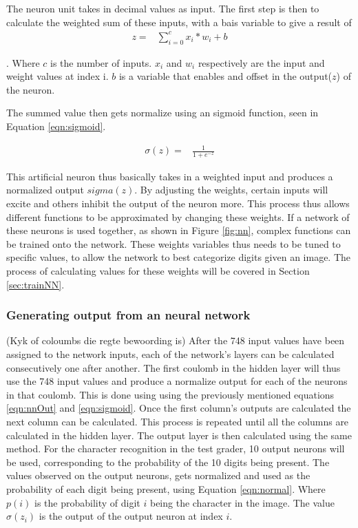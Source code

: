 The neuron unit takes in decimal values as input. The first step is then to calculate the weighted sum of these inputs, with a bais variable to give a result of 
\begin{align}
  z =  &\displaystyle{\sum_{i=0}^{c} x_{i}*w_{i} + b}
\label{eqn:nnOut}
\end{align}

.  Where $c$ is the number of inputs. $x_{i}$ and $w_{i}$ respectively are the input and weight values at index i. $b$ is a variable that enables and offset in the output($z$) of the neuron.


The summed value then gets normalize using an sigmoid function, seen in Equation \ref{eqn:sigmoid}.

\begin{align}
  \sigma(z) =  &\displaystyle{\frac{1}{1 + e^{-z}}}
\label{eqn:sigmoid}
\end{align}

This artificial neuron thus basically takes in a weighted input and produces a normalized output $sigma(z)$. By adjusting the weights, certain inputs will excite and others inhibit the output of the neuron more. This process thus allows different functions to be approximated by changing these weights. If a network of these neurons is used together, as shown in Figure \ref{fig:nn}, complex functions can be trained onto the network. These weights variables thus needs to be tuned to specific values, to allow the network to best categorize digits given an image. The process of calculating values for these weights will be covered in Section \ref{sec:trainNN}.

\subsubsection{Generating output from an neural network}
(Kyk of coloumbs die regte bewoording is)
After the 748 input values have been assigned to the network inputs, each of the network's layers can be calculated consecutively one after another. The first coulomb in the hidden layer will thus use the 748 input values and produce a normalize output for each of the neurons in that coulomb. This is done using using the previously mentioned equations \ref{eqn:nnOut} and \ref{eqn:sigmoid}. Once the first column's outputs are calculated the next column can be calculated. This process is repeated until all the columns are calculated in the hidden layer. The output layer is then calculated using the same method. For the character recognition in the test grader, 10 output neurons will be used, corresponding to the probability of the 10 digits being present. The values observed on the output neurons, gets normalized and used as the probability of each digit being present, using Equation  \ref{eqn:normal}. Where $p(i)$ is the probability of digit $i$ being the character in the image. The value $\sigma(z_{i})$ is the output of the output neuron at index $i$.

